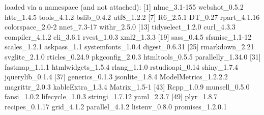 \documentclass[
]{article}
\newenvironment{Shaded}{\begin{snugshade}}{\end{snugshade}}
\newcommand{\DecValTok}[1]{\textcolor[rgb]{0.00,0.00,0.81}{#1}}
\newcommand{\FloatTok}[1]{\textcolor[rgb]{0.00,0.00,0.81}{#1}}
\newcommand{\FunctionTok}[1]{\textcolor[rgb]{0.00,0.00,0.00}{#1}}
\newcommand{\NormalTok}[1]{#1}
\newcommand{\SpecialCharTok}[1]{\textcolor[rgb]{0.00,0.00,0.00}{#1}}
\begin{document}
\begin{Shaded}
\begin{Highlighting}[]
\NormalTok{loaded via a }\FunctionTok{namespace}\NormalTok{ (and not attached)}\SpecialCharTok{:}
\NormalTok{ [}\DecValTok{1}\NormalTok{] nlme\_3}\FloatTok{.1}\DecValTok{{-}155}\NormalTok{         webshot\_0.}\FloatTok{5.2}\NormalTok{        httr\_1.}\FloatTok{4.5}\NormalTok{           tools\_4.}\FloatTok{1.2}\NormalTok{          bslib\_0.}\FloatTok{4.2}\NormalTok{          utf8\_1.}\FloatTok{2.2}          
\NormalTok{ [}\DecValTok{7}\NormalTok{] R6\_2.}\FloatTok{5.1}\NormalTok{             DT\_0}\FloatTok{.27}\NormalTok{              rpart\_4.}\FloatTok{1.16}\NormalTok{         colorspace\_2}\FloatTok{.0}\DecValTok{{-}2}\NormalTok{     nnet\_7}\FloatTok{.3}\DecValTok{{-}17}\NormalTok{          withr\_2.}\FloatTok{5.0}         
\NormalTok{[}\DecValTok{13}\NormalTok{] tidyselect\_1.}\FloatTok{2.0}\NormalTok{     curl\_4.}\FloatTok{3.3}\NormalTok{           compiler\_4.}\FloatTok{1.2}\NormalTok{       cli\_3.}\FloatTok{6.1}\NormalTok{            rvest\_1.}\FloatTok{0.3}\NormalTok{          xml2\_1.}\FloatTok{3.3}          
\NormalTok{[}\DecValTok{19}\NormalTok{] sass\_0.}\FloatTok{4.5}\NormalTok{           sfsmisc\_1}\FloatTok{.1}\DecValTok{{-}12}\NormalTok{       scales\_1.}\FloatTok{2.1}\NormalTok{         askpass\_1}\FloatTok{.1}\NormalTok{          systemfonts\_1.}\FloatTok{0.4}\NormalTok{    digest\_0.}\FloatTok{6.31}       
\NormalTok{[}\DecValTok{25}\NormalTok{] rmarkdown\_2}\FloatTok{.21}\NormalTok{       svglite\_2.}\FloatTok{1.0}\NormalTok{        rticles\_0.}\FloatTok{24.9}\NormalTok{       pkgconfig\_2.}\FloatTok{0.3}\NormalTok{      htmltools\_0.}\FloatTok{5.5}\NormalTok{      parallelly\_1.}\FloatTok{34.0}   
\NormalTok{[}\DecValTok{31}\NormalTok{] fastmap\_1.}\FloatTok{1.1}\NormalTok{        htmlwidgets\_1.}\FloatTok{5.4}\NormalTok{    rlang\_1.}\FloatTok{1.0}\NormalTok{          rstudioapi\_0}\FloatTok{.14}\NormalTok{      shiny\_1.}\FloatTok{7.4}\NormalTok{          jquerylib\_0.}\FloatTok{1.4}     
\NormalTok{[}\DecValTok{37}\NormalTok{] generics\_0.}\FloatTok{1.3}\NormalTok{       jsonlite\_1.}\FloatTok{8.4}\NormalTok{       ModelMetrics\_1.}\DecValTok{2}\NormalTok{.}\FloatTok{2.2}\NormalTok{ magrittr\_2.}\FloatTok{0.3}\NormalTok{       kableExtra\_1.}\FloatTok{3.4}\NormalTok{     Matrix\_1}\FloatTok{.5}\DecValTok{{-}1}        
\NormalTok{[}\DecValTok{43}\NormalTok{] Rcpp\_1.}\FloatTok{0.9}\NormalTok{           munsell\_0.}\FloatTok{5.0}\NormalTok{        fansi\_1.}\FloatTok{0.2}\NormalTok{          lifecycle\_1.}\FloatTok{0.3}\NormalTok{      stringi\_1.}\FloatTok{7.12}\NormalTok{       yaml\_2.}\FloatTok{3.7}          
\NormalTok{[}\DecValTok{49}\NormalTok{] plyr\_1.}\FloatTok{8.7}\NormalTok{           recipes\_0.}\FloatTok{1.17}\NormalTok{       grid\_4.}\FloatTok{1.2}\NormalTok{           parallel\_4.}\FloatTok{1.2}\NormalTok{       listenv\_0.}\FloatTok{8.0}\NormalTok{        promises\_1.}\DecValTok{2}\NormalTok{.}\FloatTok{0.1}    

\end{Highlighting}
\end{Shaded}
\end{document}
